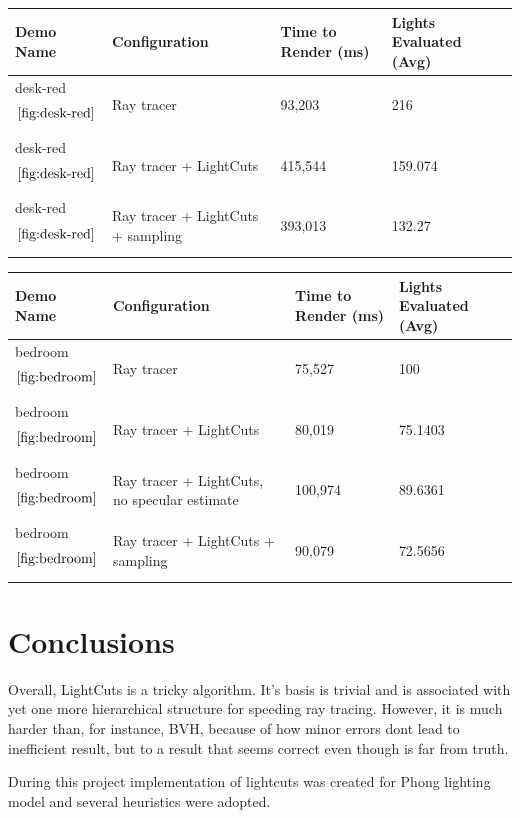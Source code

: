 \documentclass[twocolumn]{article}
\begin{document}
\begin{table}[h]
    \centering
    \begin{tabular}{|p{1cm}|p{2.5cm}|p{1.5cm}|p{1.5cm}|}
    \hline
    Demo Name & Configuration & Time to Render (ms) & Lights Evaluated (Avg) \\ \hline
    desk-red \[\ref{fig:desk-red}\] & Ray tracer & 93,203 & 216  \\ \hline
    desk-red \[\ref{fig:desk-red}\] & Ray tracer + LightCuts & 415,544 & 159.074 \\ \hline
    desk-red \[\ref{fig:desk-red}\] & Ray tracer + LightCuts + sampling & 393,013 & 132.27 \\ \hline
    \end{tabular}
\end{table}



\begin{table}[h]
    \centering
    \begin{tabular}{|p{1cm}|p{2.5cm}|p{1.5cm}|p{1.5cm}|}
    \hline
    Demo Name & Configuration & Time to Render (ms) & Lights Evaluated (Avg) \\ \hline
    bedroom \[\ref{fig:bedroom}\] & Ray tracer & 75,527 & 100  \\ \hline
    bedroom \[\ref{fig:bedroom}\] & Ray tracer + LightCuts & 80,019 & 75.1403 \\ \hline
    bedroom \[\ref{fig:bedroom}\]& Ray tracer + LightCuts, no specular estimate & 100,974 &89.6361 \\ \hline
    bedroom \[\ref{fig:bedroom}\] & Ray tracer + LightCuts + sampling &   90,079&    72.5656\\ \hline
    \end{tabular}
\end{table}


\section{Conclusions}

Overall, LightCuts is a tricky algorithm.
It's basis is trivial and is associated with yet one more hierarchical structure for speeding ray tracing.
However, it is much harder than, for instance, BVH, because of how minor errors dont lead to inefficient result, but to a result that seems correct even though is far from truth.

During this project implementation of lightcuts was created for Phong lighting model and several heuristics were adopted.
\end{document}
